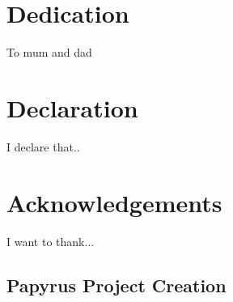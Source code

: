 \documentclass[12pt,twoside]{book}
\begin{document}
\chapter*{Dedication}
To mum and dad

\chapter*{Declaration}
I declare that..

\chapter*{Acknowledgements}
I want to thank...

\tableofcontents
\listoftables
\listoffigures













\begin{appendices}
\chapter{Papyrus Project Creation}

\end{appendices}


\end{document}

